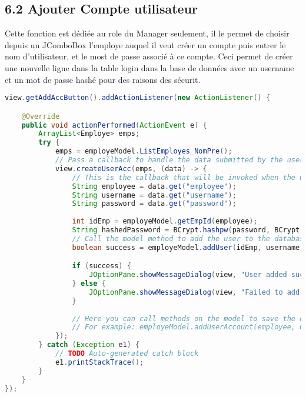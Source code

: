 \documentclass[a4paper,12pt]{report}
\begin{document}
\subsection{\textcolor{mygreen}{6.2 Ajouter Compte utilisateur}}
Cette fonction est dédiée au role du Manager seulement, il le permet de choisir depuis un JComboBox l'employe auquel il veut créer un compte
puis entrer le nom d'utilisateur, et le most de passe associé à ce compte. Ceci permet de créer une nouvelle ligne dans la table login dans la base 
de données avec un username et un mot de passe hashé pour des raisons des sécurit.
\begin{lstlisting}[language=java, caption={Action de la boutton créer compte}]
view.getAddAccButton().addActionListener(new ActionListener() {

    @Override
    public void actionPerformed(ActionEvent e) {
        ArrayList<Employe> emps;
        try {
            emps = employeModel.ListEmployes_NomPre();
            // Pass a callback to handle the data submitted by the user
            view.createUserAcc(emps, (data) -> {
                // This is the callback that will be invoked when the user submits the form
                String employee = data.get("employee");
                String username = data.get("username");
                String password = data.get("password");
                
                int idEmp = employeModel.getEmpId(employee);
                String hashedPassword = BCrypt.hashpw(password, BCrypt.gensalt());
                // Call the model method to add the user to the database
                boolean success = employeModel.addUser(idEmp, username, hashedPassword);

                if (success) {
                    JOptionPane.showMessageDialog(view, "User added successfully!");
                } else {
                    JOptionPane.showMessageDialog(view, "Failed to add user.");
                }
                
                // Here you can call methods on the model to save the data
                // For example: employeModel.addUserAccount(employee, username, password);
            });
        } catch (Exception e1) {
            // TODO Auto-generated catch block
            e1.printStackTrace();
        }
    }		
});
\end{lstlisting}
\newpage
\end{document}
